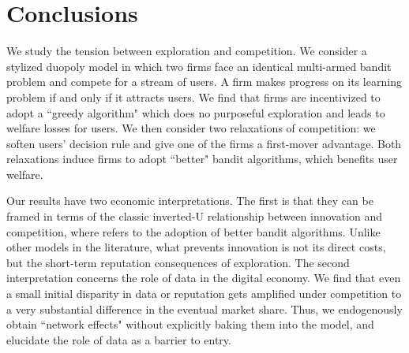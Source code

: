 \documentclass[../competing_bandits.tex]{subfiles}
\begin{document}
\section{Conclusions}\label{sec:conclusion}

We study the tension between exploration and competition. We consider a stylized duopoly model in which two firms face an identical multi-armed bandit problem and compete for a stream of users. A firm makes progress on its learning problem if and only if it attracts users.
We find that firms are incentivized to adopt a ``greedy algorithm" which does no purposeful exploration and leads to welfare losses for users. We then consider two relaxations of competition: we soften users' decision rule and give one of the firms a first-mover advantage. Both relaxations induce firms to adopt ``better" bandit algorithms, which benefits user welfare.


Our results have two economic interpretations. The first is that they can be framed in terms of the classic inverted-U relationship between innovation and competition, where \innovation refers to the adoption of better bandit algorithms. Unlike other models in the literature, what prevents innovation is not its direct costs, but the short-term reputation consequences of exploration. The second interpretation concerns the role of data in the digital economy. We find that even a small initial disparity in data or reputation gets amplified under competition to a very substantial difference in the eventual market share. Thus, we endogenously obtain ``network effects" without explicitly baking them into the model, and elucidate the role of data as a barrier to entry.
\end{document}
